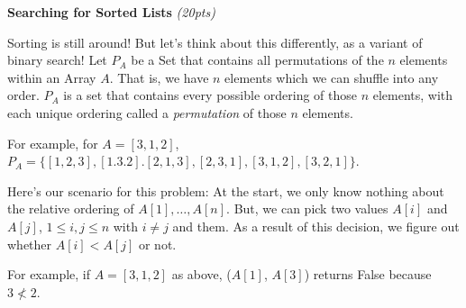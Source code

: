 \documentclass{exam}
\begin{document}
\begin{questions}

    \question \textbf{Searching for Sorted Lists} \textit{(20pts)}
    
    Sorting is still around! But let's think about this differently, as a variant of binary search! Let $P_A$ be a Set that contains all permutations of the $n$ elements within an Array $A$. That is, we have $n$ elements which we can shuffle into any order. $P_A$ is a set that contains every possible ordering of those $n$ elements, with each unique ordering called a \textit{permutation} of those $n$ elements. 

    For example, for $A = [3, 1, 2]$, $P_A = \{[1, 2, 3], [1. 3. 2]. [2, 1, 3], [2, 3, 1], [3, 1, 2], [3, 2 ,1]\}$. 

    Here's our scenario for this problem: At the start, we only know nothing about the relative ordering of $A[1], \dots, A[n]$. But, we can pick two values $A[i]$ and $A[j]$, $1 \leq i, j \leq n$ with $i \neq j$ and  them. As a result of this decision, we figure out whether $A[i] < A[j]$ or not.

    For example, if $A = [3, 1, 2]$ as above, ($A[1]$, $A[3]$) returns False because $3 \nless 2$.
    
\end{questions}
\end{document}
